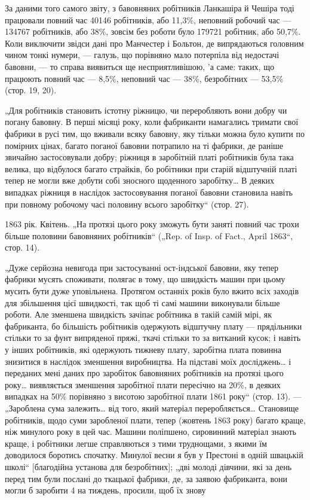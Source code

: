 
За даними того самого звіту, з бавовняних робітників Ланкашіра
й Чешіра тоді працювали повний час \num{40146} робітників,
або 11,3\%, неповний робочий час — \num{134767} робітників, або 38\%,
зовсім без роботи було \num{179721} робітник, або 50,7\%. Коли виключити
звідси дані про Манчестер і Больтон, де випрядаються
головним чином тонкі нумери, — галузь, що порівняно мало потерпіла
від недостачі бавовни, — то справа виявиться ще несприятливішою, 'а
саме: таких, що працюють повний час — 8,5\%,
неповний час — 38\%, безробітних — 53,5\% (стор. 19, 20).

„Для робітників становить істотну ріжницю, чи переробляють
вони добру чи погану бавовну. В перші місяці року, коли фабриканти
намагались тримати свої фабрики в русі тим, що вживали
всяку бавовну, яку тільки можна було купити по помірних цінах,
багато поганої бавовни потрапило на ті фабрики, де раніше звичайно
застосовували добру; ріжниця в заробітній платі робітників
була така велика, що відбулося багато страйків, бо робітники
при старій відштучній платі тепер не могли вже добути
собі зносного щоденного заробітку\dots{} В деяких випадках ріжниця
в наслідок застосовування поганої бавовни становила навіть при
повному робочому часі половину всього заробітку“ (стор. 27).

1863 рік. Квітень. „На протязі цього року зможуть бути заняті
повний час трохи більше половини бавовняних робітників“
(„Rep. of Insp. of Fact., April 1863“, стор. 14).

„Дуже серйозна невигода при застосуванні ост-індської бавовни,
яку тепер фабрики мусять споживати, полягає в тому,
що швидкість машин при цьому мусить бути дуже уповільнена.
Протягом останніх років було вжито всіх заходів для збільшення
цієї швидкості, так щоб ті самі машини виконували більше
роботи. Але зменшена швидкість зачіпає робітника в такій самій
мірі, як фабриканта, бо більшість робітників одержують відштучну
плату — прядільники стільки то за фунт випряденої
пряжі, ткачі стільки то за витканий кусок; і навіть у інших
робітників, які одержують тижневу плату, заробітна плата повинна
знизитися в наслідок зменшення виробництва. На підставі
моїх досліджень\dots{} і переданих мені даних про заробіток бавовняних
робітників на протязі цього року\dots{} виявляється зменшення
заробітної плати пересічно на 20\%, в деяких випадках
на 50\% порівняно з висотою заробітної плати 1861 року“
(стор. 13). — „Зароблена сума залежить\dots{} від того, який матеріал
переробляється\dots{} Становище робітників, щодо суми заробленої
плати, тепер (жовтень 1863 року) багато краще, ніж минулого
року в цей час. Машини поліпшено, сировинний матеріал
знають краще, і робітники легше справляються з тими труднощами,
з якими їм доводилося боротись спочатку. Минулої весни
я був у Престоні в одній швацькій школі“ [благодійна установа
для безробітних]; „дві молоді дівчини, які за день перед тим
були послані до ткацької фабрики, де, за заявою фабриканта, вони
могли б заробити 4 на тиждень, просили, щоб їх знову
\parbreak{}  %
